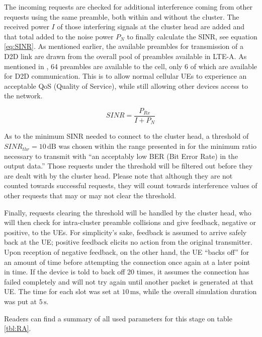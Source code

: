 The incoming requests are checked for additional interference coming from other requests using the same preamble, both within and without the cluster. The received power $I$ of those interfering signals at the cluster head are added and that total added to the noise power $P_N$ to finally calculate the SINR, see equation \ref{eq:SINR}. As mentioned earlier, the available preambles for transmission of a D2D link are drawn from the overall pool of preambles available in LTE-A. As mentioned in \cite{Cox2012}, 64 preambles are available to the cell, only 6 of which are available for D2D communication. This is to allow normal cellular UEs to experience an acceptable QoS (Quality of Service), while still allowing other devices access to the network.

\begin{equation}\label{eq:SINR}
SINR = \frac {P_{Rx}} {I + P_N}
\end{equation}

As to the minimum SINR needed to connect to the cluster head, a threshold of $SINR_{thr} = 10\,\text{dB}$ was chosen within the range presented in \cite{3Gpp2009} for the minimum ratio necessary to transmit with ``an acceptably low BER (Bit Error Rate) in the output data.'' Those requests under the threshold will be filtered out before they are dealt with by the cluster head. Please note that although they are not counted towards successful requests, they will count towards interference values of other requests that may or may not clear the threshold.

Finally, requests clearing the threshold will be handled by the cluster head, who will then check for intra-cluster preamble collisions and give feedback, negative or positive, to the UEs. For simplicity's sake, feedback is assumed to arrive safely back at the UE; positive feedback elicits no action from the original transmitter. Upon reception of negative feedback, on the other hand, the UE ``backs off'' for an amount of time before attempting the connection once again at a later point in time. If the device is told to back off 20 times, it assumes the connection has failed completely and will not try again until another packet is generated at that UE. The time for each slot was set at $10\,\text{ms}$, while the overall simulation duration was put at $5\,\text{s}$.

Readers can find a summary of all used parameters for this stage on table \ref{tbl:RA}.

